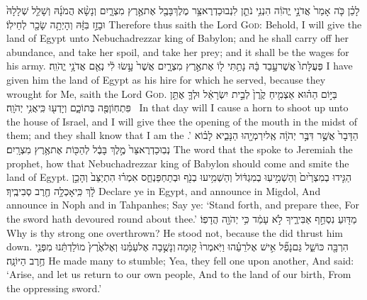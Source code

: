 {לָכֵ֗ן כֹּ֤ה אָמַר֙ אֲדֹנָ֣י יֱהֹוִ֔ה הִנְנִ֥י נֹתֵ֛ן לִנְבוּכַדְרֶאצַּ֥ר מֶלֶךְ\maqqaf בָּבֶ֖ל אֶת\maqqaf אֶ֣רֶץ מִצְרָ֑יִם וְנָשָׂ֨א הֲמֹנָ֜הּ וְשָׁלַ֤ל שְׁלָלָהּ֙ וּבָזַ֣ז בִּזָּ֔הּ וְהָיְתָ֥ה שָׂכָ֖ר לְחֵילֽוֹ׃}
{Therefore thus saith the Lord \textsc{God}: Behold, I will give the land of Egypt unto Nebuchadrezzar king of Babylon; and he shall carry off her abundance, and take her spoil, and take her prey; and it shall be the wages for his army.}
{פְּעֻלָּתוֹ֙ אֲשֶׁר\maqqaf עָ֣בַד בָּ֔הּ נָתַ֥תִּי ל֖וֹ אֶת\maqqaf אֶ֣רֶץ מִצְרָ֑יִם אֲשֶׁר֙ עָ֣שׂוּ לִ֔י נְאֻ֖ם אֲדֹנָ֥י יֱהֹוִֽה׃}
{I have given him the land of Egypt as his hire for which he served, because they wrought for Me, saith the Lord \textsc{God}.}
{בַּיּ֣וֹם הַה֗וּא אַצְמִ֤יחַ קֶ֙רֶן֙ לְבֵ֣ית יִשְׂרָאֵ֔ל וּלְךָ֛ אֶתֵּ֥ן פִּתְחֽוֹן\maqqaf פֶּ֖ה בְּתוֹכָ֑ם וְיָדְע֖וּ כִּֽי\maqqaf אֲנִ֥י יְהֹוָֽה׃ \petucha }
{In that day will I cause a horn to shoot up unto the house of Israel, and I will give thee the opening of the mouth in the midst of them; and they shall know that I am the \lord.’}
\newperek
{}
\label{haft_15}
\setcounter{chap}{46}
\setcounter{verse}{13}
{הַדָּבָר֙ אֲשֶׁ֣ר דִּבֶּ֣ר יְהֹוָ֔ה אֶֽל\maqqaf יִרְמְיָ֖הוּ הַנָּבִ֑יא לָב֗וֹא נְבֽוּכַדְרֶאצַּר֙ מֶ֣לֶךְ בָּבֶ֔ל לְהַכּ֖וֹת אֶת\maqqaf אֶ֥רֶץ מִצְרָֽיִם׃}
{The word that the \lord\space spoke to Jeremiah the prophet, how that Nebuchadrezzar king of Babylon should come and smite the land of Egypt.}
{הַגִּ֤ידוּ בְמִצְרַ֙יִם֙ וְהַשְׁמִ֣יעֽוּ בְמִגְדּ֔וֹל וְהַשְׁמִ֥יעוּ בְנֹ֖ף וּבְתַחְפַּנְחֵ֑ס אִמְר֗וּ הִתְיַצֵּב֙ וְהָכֵ֣ן לָ֔ךְ כִּֽי\maqqaf אָכְלָ֥ה חֶ֖רֶב סְבִיבֶֽיךָ׃}
{Declare ye in Egypt, and announce in Migdol, And announce in Noph and in Tahpanhes; Say ye: ‘Stand forth, and prepare thee, For the sword hath devoured round about thee.’}
{מַדּ֖וּעַ נִסְחַ֣ף אַבִּירֶ֑יךָ לֹ֣א עָמַ֔ד כִּ֥י יְהֹוָ֖ה הֲדָפֽוֹ׃}
{Why is thy strong one overthrown? He stood not, because the \lord\space did thrust him down.}
{הִרְבָּ֖ה כּוֹשֵׁ֑ל גַּם\maqqaf נָפַ֞ל אִ֣ישׁ אֶל\maqqaf רֵעֵ֗הוּ וַיֹּֽאמְרוּ֙ ק֣וּמָה \legarmeh  וְנָשֻׁ֣בָה אֶל\maqqaf עַמֵּ֗נוּ וְאֶל\maqqaf אֶ֙רֶץ֙ מוֹלַדְתֵּ֔נוּ מִפְּנֵ֖י חֶ֥רֶב הַיּוֹנָֽה׃}
{He made many to stumble; Yea, they fell one upon another, And said: ‘Arise, and let us return to our own people, And to the land of our birth, From the oppressing sword.’}
